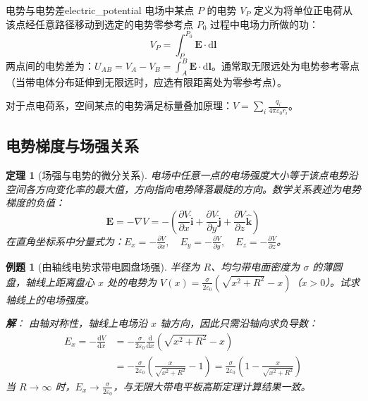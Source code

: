\documentclass[11pt,a4paper,fontset=fandol]{ctexart}
\newtheorem{theorem}{定理}[section]
\newtheorem{example}{例题}[section]
\theoremstyle{remark}
\begin{document}
\begin{definition}{电势与电势差}{electric_potential}
电场中某点 $P$ 的电势 $V_P$ 定义为将单位正电荷从该点经任意路径移动到选定的电势零参考点 $P_0$ 过程中电场力所做的功：
\begin{equation}
    V_P = \int_P^{P_0} \bm{E} \cdot \mathrm{d}\bm{l}
\end{equation}
两点间的电势差为：$U_{AB} = V_A - V_B = \int_A^B \bm{E} \cdot \mathrm{d}\bm{l}$。通常取无限远处为电势参考零点（当带电体分布延伸到无限远时，应选有限距离处为零参考点）。
\end{definition}

对于点电荷系，空间某点的电势满足标量叠加原理：$V = \sum_i \frac{q_i}{4\pi\varepsilon_0 r_i}$。

\subsection{电势梯度与场强关系}

\begin{theorem}[场强与电势的微分关系]
电场中任意一点的电场强度大小等于该点电势沿空间各方向变化率的最大值，方向指向电势降落最陡的方向。数学关系表述为电势梯度的负值：
\begin{equation}
    \bm{E} = -\nabla V = -\left( \frac{\partial V}{\partial x}\hat{\bm{i}} + \frac{\partial V}{\partial y}\hat{\bm{j}} + \frac{\partial V}{\partial z}\hat{\bm{k}} \right)
\end{equation}
在直角坐标系中分量式为：$E_x = -\frac{\partial V}{\partial x},\quad E_y = -\frac{\partial V}{\partial y},\quad E_z = -\frac{\partial V}{\partial z}$。
\end{theorem}

\begin{example}[由轴线电势求带电圆盘场强]
半径为 $R$、均匀带电面密度为 $\sigma$ 的薄圆盘，轴线上距离盘心 $x$ 处的电势为 $V(x) = \frac{\sigma}{2\varepsilon_0}\left(\sqrt{x^2+R^2} - x\right)$（$x>0$）。试求轴线上的电场强度。

\textbf{解}：
由轴对称性，轴线上电场沿 $x$ 轴方向，因此只需沿轴向求负导数：
\begin{align*}
    E_x = -\frac{\mathrm{d}V}{\mathrm{d}x} &= -\frac{\sigma}{2\varepsilon_0}\frac{\mathrm{d}}{\mathrm{d}x}\left(\sqrt{x^2+R^2} - x\right) \\
    &= -\frac{\sigma}{2\varepsilon_0}\left( \frac{x}{\sqrt{x^2+R^2}} - 1 \right) = \frac{\sigma}{2\varepsilon_0}\left( 1 - \frac{x}{\sqrt{x^2+R^2}} \right)
\end{align*}
当 $R \to \infty$ 时，$E_x \to \frac{\sigma}{2\varepsilon_0}$，与无限大带电平板高斯定理计算结果一致。
\end{example}
\end{document}
